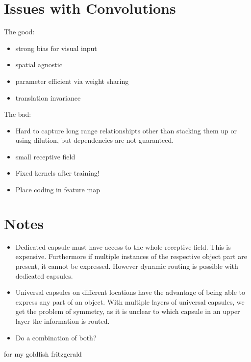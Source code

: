 \documentclass{article}
\begin{document}
\section{Issues with Convolutions}
The good:
\begin{itemize}
	\item strong bias for visual input
	\item spatial agnostic
	\item parameter efficient via weight sharing
	\item translation invariance
\end{itemize}

The bad:
\begin{itemize}
	\item Hard to capture long range relationshipts other than stacking them up or using dilution, but dependencies are not guaranteed.
	\item small receptive field
	\item Fixed kernels after training!
	\item Place coding in feature map
\end{itemize}

\section{Notes}

\begin{itemize}
	\item Dedicated capsule must have access to the whole receptive field. This is expensive. Furthermore if multiple instances of the respective object part are present, it cannot be expressed. However dynamic routing is possible with dedicated capsules.
	\item Universal capsules on different locations have the advantage of being able to express any part of an object. With multiple layers of universal capsules, we get the problem of symmetry, as it is unclear to which capsule in an upper layer the information is routed.
	\item Do a combination of both?
\end{itemize}

\begin{ack}
for my goldfish fritzgerald
\end{ack}



\end{document}
